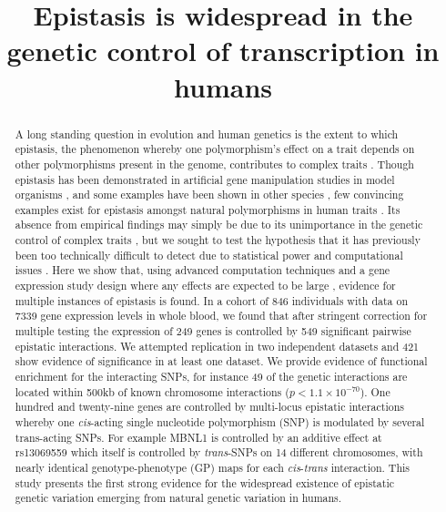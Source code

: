 \documentclass{article}
\title{Epistasis is widespread in the genetic control of transcription in humans}
\begin{document}
\maketitle


\begin{abstract}
A long standing question in evolution and human genetics is the extent to which epistasis, the phenomenon whereby one polymorphism's effect on a trait depends on other polymorphisms present in the genome, contributes to complex traits \cite{Phillips1998, Carlborg2004, Hill2008a, Crow2010}. Though epistasis has been demonstrated in artificial gene manipulation studies in model organisms \cite{Costanzo2010, Bloom2013}, and some examples have been shown in other species \cite{Carlborg2006}, few convincing examples exist for epistasis amongst natural polymorphisms in human traits \cite{Strange2010, Evans2011}. Its absence from empirical findings may simply be due to its unimportance in the genetic control of complex traits \cite{Hill2008a, Crow2010}, but we sought to test the hypothesis that it has previously been too technically difficult to detect due to statistical power and computational issues \cite{Greene2009, Hemani2013}. Here we show that, using advanced computation techniques \cite{Hemani2011} and a gene expression study design where any effects are expected to be large \cite{Powell2012}, evidence for multiple instances of epistasis is found. In a cohort of 846 individuals with data on 7339 gene expression levels in whole blood, we found that after stringent correction for multiple testing the expression of 249 genes is controlled by 549 significant pairwise epistatic interactions. We attempted replication in two independent datasets \cite{Metspalu2004, Fehrmann2011} and 421 show evidence of significance in at least one dataset. We provide evidence of functional enrichment for the interacting SNPs, for instance 49 of the genetic interactions are located within 500kb of known chromosome interactions \cite{Lan2012} ($p < 1.1 \times 10^{-70}$). One hundred and twenty-nine genes are controlled by multi-locus epistatic interactions whereby one \emph{cis}-acting single nucleotide polymorphism (SNP) is modulated by several trans-acting SNPs. For example MBNL1 is controlled by an additive effect at rs13069559 which itself is controlled by \emph{trans}-SNPs on 14 different chromosomes, with nearly identical genotype-phenotype (GP) maps for each \emph{cis}-\emph{trans} interaction. This study presents the first strong evidence for the widespread existence of epistatic genetic variation emerging from natural genetic variation in humans.
\end{abstract}
\end{document}
